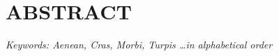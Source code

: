 \section*{ABSTRACT}

    \lipsum[1]
    
    \textit{Keywords: Aenean, Cras, Morbi, Turpis \dots in alphabetical order}
